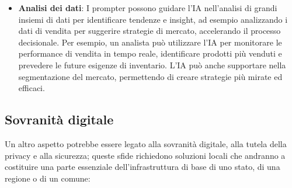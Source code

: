 \begin{itemize}
                \item \textbf{Analisi dei dati}: I prompter possono guidare l'IA nell'analisi di grandi  insiemi di dati per identificare tendenze e insight, ad esempio analizzando i dati di vendita per suggerire strategie di mercato, accelerando il processo decisionale. Per esempio, un analista può utilizzare l'IA per monitorare le performance di vendita in tempo reale, identificare prodotti più venduti e prevedere le future esigenze di inventario. L'IA può anche supportare nella segmentazione del mercato, permettendo di creare strategie più mirate ed efficaci.
            \end{itemize}
        
    \subsection{Sovranità digitale}
        Un altro aspetto potrebbe essere legato alla sovranità digitale, alla tutela della privacy e alla sicurezza; queste sfide richiedono soluzioni locali che andranno a costituire una parte essenziale dell'infrastruttura di base di uno stato, di una regione o di un comune:
    
